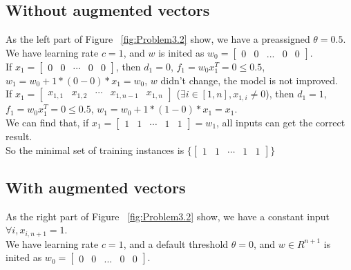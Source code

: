 \documentclass[paper=a4, fontsize=11pt]{scrartcl} %
\numberwithin{equation}{section} %
\numberwithin{figure}{section} %
\numberwithin{table}{section} %
\begin{document}
\subsection{Without augmented vectors}

As the left part of Figure ~\ref{fig:Problem3.2} show, we have a preassigned $\theta=0.5$.\\

We have learning rate $c=1$, 
and $w$ is inited as $w_0=\begin{bmatrix}0 & 0 & ... & 0 & 0\end{bmatrix}$.\\

If $x_1=\begin{bmatrix}0 & 0 & \cdots & 0 & 0\end{bmatrix}$, then $d_1=0$,
$f_1=w_0x_1^T=0 \leqslant 0.5$,
$w_1=w_0+1*(0-0)*x_1 = w_0$, $w$ didn't change, the model is not improved.\\

If $x_1=\begin{bmatrix}x_{1, 1} & x_{1, 2} & \cdots & x_{1, n-1} & x_{1, n}\end{bmatrix}$ 
    ($\exists i \in [1, n], x_{1, i} \neq 0$), then $d_1=1$, 
$f_1=w_0x_1^T=0 \leqslant 0.5$, $w_1=w_0+1*(1-0)*x_1 = x_1$.\\

We can find that, if $x_1=\begin{bmatrix}1 & 1 & \cdots & 1 & 1\end{bmatrix}=w_1$, 
all inputs can get the correct result.\\

So the minimal set of training instances is $\{\begin{bmatrix}1 & 1 & \cdots & 1 & 1\end{bmatrix}\}$

\subsection{With augmented vectors}

As the right part of Figure ~\ref{fig:Problem3.2} show, we have a constant input $\forall i, x_{i,n+1}=1$.\\

We have learning rate $c=1$, and a default threshold $\theta=0$, 
and $w \in R^{n+1}$ is inited as $w_0=\begin{bmatrix}0 & 0 & ... & 0 & 0\end{bmatrix}$.\\
\end{document}
